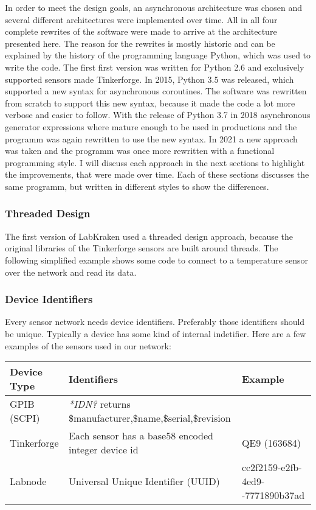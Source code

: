 In order to meet the design goals, an asynchronous architecture was chosen and several different architectures were implemented over time. All in all four complete rewrites of the software were made to arrive at the architecture presented here. The reason for the rewrites is mostly historic and can be explained by the history of the programming language Python, which was used to write the code. The first first version was written for Python 2.6 and exclusively supported sensors made Tinkerforge. In 2015, Python 3.5 was released, which supported a new syntax for asynchronous coroutines. The software was rewritten from scratch to support this new syntax, because it made the code a lot more verbose and easier to follow. With the release of Python 3.7 in 2018 asynchronous generator expressions where mature enough to be used in productions and the programm was again rewritten to use the new syntax. In 2021 a new approach was taken and the programm was once more rewritten with a functional programming style. I will discuss each approach in the next sections to highlight the improvements, that were made over time. Each of these sections discusses the same programm, but written in different styles to show the differences.

\subsubsection{Threaded Design}
The first version of LabKraken used a threaded design approach, because the original libraries of the Tinkerforge sensors are built around threads. The following simplified example shows some code to connect to a temperature sensor over the network and read its data.


\subsubsection{Device Identifiers}
Every sensor network needs device identifiers. Preferably those identifiers should be unique. Typically a device has some kind of internal indetifier. Here are a few examples of the sensors used in our network:

\begin{table}[ht]
\centering
\begin{tabularx}{0.95\textwidth}{|l|p{6.5cm}|X|}
    \hline
    Device Type& Identifiers& Example\\
    \hline
    GPIB (SCPI)& \textit{*IDN?} returns \newline \$manufacturer,\$name,\$serial,\$revision& \\
    \hline
    Tinkerforge& Each sensor has a base58 encoded integer device id& QE9 (163684)\\
    \hline
    Labnode& Universal Unique Identifier (UUID) & cc2f2159-e2fb-4ed9-\newline8021-7771890b37ad\\
    \hline
\end{tabularx}
\end{table}

